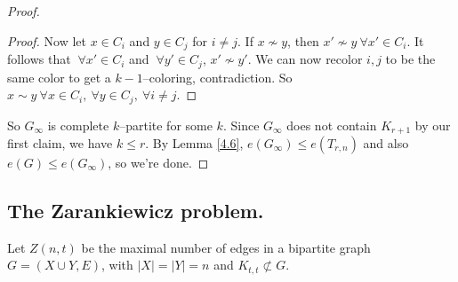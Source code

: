 \documentclass{article}
\theoremstyle{definition}
\begin{document}
\begin{proof}
\begin{proof}
        Now let $x \in C_i$ and $y \in C_j$ for $i \neq j$. If $x \not\sim y$, then $x' \not\sim y ~\forall  x' \in C_i$. It follows that $~\forall x' \in C_i$ and $~\forall y' \in C_j$, $x' \not\sim y'$. We can now recolor $i,j$ to be the same color to get a $k-1$--coloring, contradiction. So $x \sim y ~\forall x \in C_i, ~\forall y \in C_j, ~\forall i\neq j$.
    \end{proof}
    So $G_{\infty}$ is complete $k$--partite for some $k$. Since $G_{\infty}$ does not contain $K_{r+1}$ by our first claim, we have $k\le r$. By Lemma \ref{4.6}, $e(G_{\infty}) \le e(T_{r,n})$ and also $e(G) \le e(G_{\infty})$, so we're done.
\end{proof}

\subsection*{The Zarankiewicz problem.} 

Let $Z(n,t)$ be the maximal number of edges in a bipartite graph $G = (X \cup Y, E)$, with $|X|=|Y|=n$ and $K_{t,t} \not\subset G$.
\end{document}
